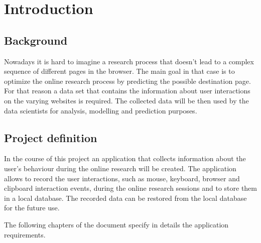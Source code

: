 \chapter{Introduction}
\label{ch:introduction}

\section{Background}
Nowadays it is hard to imagine a research process that doesn't lead to a complex sequence of different pages in the browser. The main goal in that case is to optimize the online research process by predicting the possible destination page. For that reason a data set that contains the information about user interactions on the varying websites is required. The collected data will be then used by the data scientists for analysis, modelling and prediction purposes.

\section{Project definition}
In the course of this project an application that collects information about the user's behaviour during the online research will be created. The application allows to record the user interactions, such as mouse, keyboard, browser and clipboard interaction events, during the online research sessions and to store them in a local database. The recorded data can be restored from the local database for the future use.

The following chapters of the document specify in details the application requirements. 